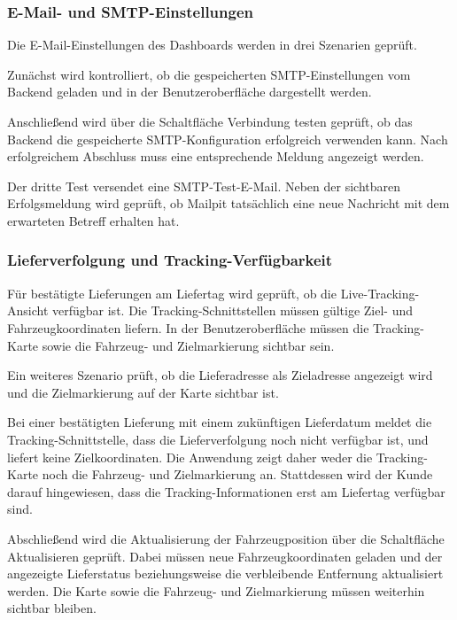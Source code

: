 \subsubsection{E-Mail- und SMTP-Einstellungen}

Die E-Mail-Einstellungen des Dashboards werden in drei
Szenarien geprüft.

Zunächst wird kontrolliert, ob die gespeicherten
SMTP-Einstellungen vom Backend geladen und in der
Benutzeroberfläche dargestellt werden.

Anschließend wird über die Schaltfläche
\glqq Verbindung testen\grqq{} geprüft, ob das Backend die
gespeicherte SMTP-Konfiguration erfolgreich verwenden kann.
Nach erfolgreichem Abschluss muss eine entsprechende Meldung
angezeigt werden.

Der dritte Test versendet eine SMTP-Test-E-Mail. Neben der
sichtbaren Erfolgsmeldung wird geprüft, ob Mailpit tatsächlich
eine neue Nachricht mit dem erwarteten Betreff erhalten hat.

\subsubsection{Lieferverfolgung und Tracking-Verfügbarkeit}

Für bestätigte Lieferungen am Liefertag wird geprüft, ob die
Live-Tracking-Ansicht verfügbar ist. Die Tracking-Schnittstellen
müssen gültige Ziel- und Fahrzeugkoordinaten liefern. In der
Benutzeroberfläche müssen die Tracking-Karte sowie die
Fahrzeug- und Zielmarkierung sichtbar sein.

Ein weiteres Szenario prüft, ob die Lieferadresse als
Zieladresse angezeigt wird und die Zielmarkierung auf der Karte
sichtbar ist.

Bei einer bestätigten Lieferung mit einem zukünftigen
Lieferdatum meldet die Tracking-Schnittstelle, dass die
Lieferverfolgung noch nicht verfügbar ist, und liefert keine
Zielkoordinaten. Die Anwendung zeigt daher weder die
Tracking-Karte noch die Fahrzeug- und Zielmarkierung an.
Stattdessen wird der Kunde darauf hingewiesen, dass die
Tracking-Informationen erst am Liefertag verfügbar sind.

Abschließend wird die Aktualisierung der Fahrzeugposition über die
Schaltfläche \glqq Aktualisieren\grqq{} geprüft. Dabei müssen neue
Fahrzeugkoordinaten geladen und der angezeigte Lieferstatus
beziehungsweise die verbleibende Entfernung aktualisiert
werden. Die Karte sowie die Fahrzeug- und Zielmarkierung müssen
weiterhin sichtbar bleiben.
